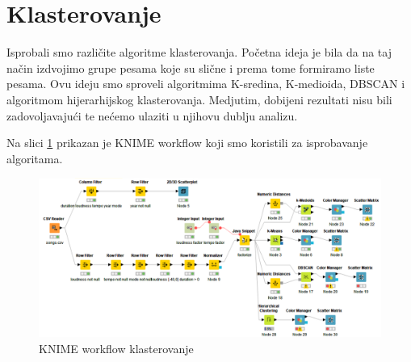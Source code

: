 \section{Klasterovanje}
\label{sec:Klasterovanje}

Isprobali smo razli\v{c}ite algoritme klasterovanja. Po\v{c}etna ideja je bila da na taj na\v{c}in izdvojimo grupe pesama koje su sli\v{c}ne i prema tome formiramo liste pesama. Ovu ideju smo sproveli algoritmima K-sredina, K-medioida, DBSCAN i algoritmom hijerarhijskog klasterovanja. Medjutim, dobijeni rezultati nisu bili zadovoljavaju\'c{}i te ne\'c{}emo ulaziti u njihovu dublju analizu.

Na slici \ref{fig:knime-klasterovanje} prikazan je KNIME workflow koji smo koristili za isprobavanje algoritama.

\begin{figure}[H]
\centering
    \includegraphics[scale=0.5]{KNIME workflows/screenshots/klasterovanje.PNG}
    \caption{KNIME workflow klasterovanje}
    \label{fig:knime-klasterovanje}
\end{figure}


